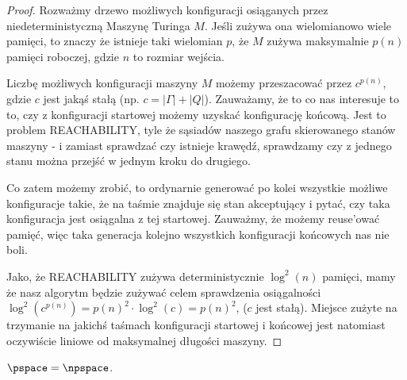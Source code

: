     \begin{proof}
    
        Rozważmy drzewo możliwych konfiguracji osiąganych przez niedeterministyczną Maszynę Turinga \(M\). Jeśli zużywa ona wielomianowo wiele pamięci, to
        znaczy że istnieje taki wielomian \(p\), że \(M\) zużywa maksymalnie \(p(n)\) pamięci roboczej, gdzie \(n\) to rozmiar wejścia. 
        
        Liczbę możliwych konfiguracji maszyny \(M\) możemy przeszacować przez \(c^{p(n)}\), gdzie \(c\) jest jakąś stałą
        (np. \(c = |\Gamma| + |Q|\)). Zauważamy, że to co nas interesuje to to, czy z konfiguracji startowej możemy uzyskać konfigurację końcową.
        Jest to problem \textsc{REACHABILITY}, tyle że sąsiadów naszego grafu skierowanego stanów maszyny - i zamiast sprawdzać czy istnieje krawędź,
        sprawdzamy czy z jednego stanu można przejść w jednym kroku do drugiego. 
        
        Co zatem możemy zrobić, to ordynarnie generować po kolei wszystkie możliwe konfiguracje takie, że na taśmie znajduje się stan akceptujący i pytać,
        czy taka konfiguracja jest osiągalna z tej startowej. Zauważmy, że możemy reuse'ować pamięć, więc taka generacja kolejno wszystkich konfiguracji
        końcowych nas nie boli.
        
        Jako, że \textsc{REACHABILITY} zużywa deterministycznie \(\log^2(n)\) pamięci, mamy że nasz algorytm będzie zużywać celem sprawdzenia
        osiągalności \(\log^2(c^{p(n)}) = p(n)^2 \cdot \log^2(c) = p(n)^2 \), (\(c\) jest stałą). Miejsce zużyte na trzymanie na jakichś taśmach
        konfiguracji startowej i końcowej jest natomiast oczywiście liniowe od maksymalnej długości maszyny.
    \end{proof}
    
\begin{corollary}
    \( \pspace = \npspace \).
\end{corollary}